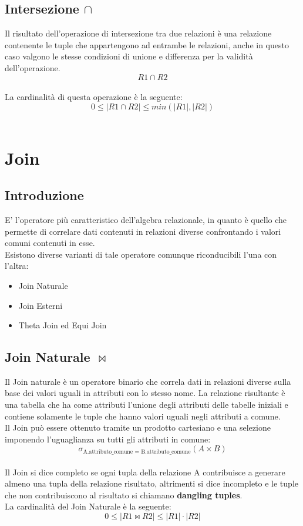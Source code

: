 \documentclass{report}
\begin{document}
\subsection{Intersezione $\cap$}
Il risultato dell'operazione di intersezione tra due relazioni è una relazione contenente le tuple che appartengono ad entrambe le relazioni, anche in questo caso valgono le stesse condizioni di unione e differenza per la validità dell'operazione.\\
$$R1 \cap R2$$\\
La cardinalità di questa operazione è la seguente:\\
$$ 0 \leq |R1 \cap R2| \leq min(|R1|, |R2|)$$\\

\section{Join}
\subsection{Introduzione}
E’ l’operatore più caratteristico dell’algebra relazionale, in quanto è quello che permette di correlare dati contenuti in relazioni diverse confrontando i valori comuni contenuti in esse.\\
Esistono diverse varianti di tale operatore comunque riconducibili l’una con l’altra:
\begin{itemize} 
    \item Join Naturale
    \item Join Esterni
    \item Theta Join ed Equi Join\\
\end{itemize}
\subsection{Join Naturale $\bowtie$}
Il Join naturale è un operatore binario che correla dati in relazioni diverse sulla base dei valori uguali in attributi con lo stesso nome. La relazione risultante è una tabella che ha come attributi l’unione degli attributi delle tabelle iniziali e contiene solamente le tuple che hanno valori uguali negli attributi a comune.\\
Il Join può essere ottenuto tramite un prodotto cartesiano e una selezione imponendo l’uguaglianza su tutti gli attributi in comune:\\
$$\sigma_{\text{A.attributo\_comune = B.attributo\_comune}}(A \times B)$$\\
Il Join si dice completo se ogni tupla della relazione A contribuisce a generare almeno una tupla della relazione risultato, altrimenti si dice incompleto e le tuple che non contribuiscono al risultato si chiamano \textbf{dangling tuples}.\\
La cardinalità del Join Naturale è la seguente:\\
$$0 \leq |R1 \bowtie R2| \leq |R1| \cdot |R2|$$\\
\newpage
\end{document}
